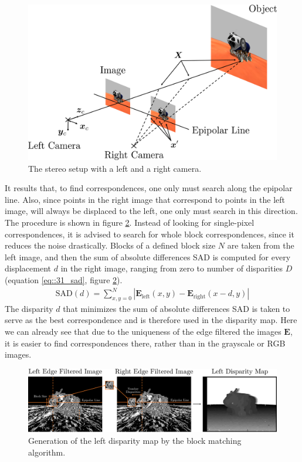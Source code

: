\begin{figure}[h!]
	\centering
	\includegraphics[scale=.28]{chapters/03_fundamentals_of_image_processing/img/stereo_camera.png}
	\caption{The stereo setup with a left and a right camera.}
	\label{fig::31_stereo_camera}
\end{figure}
It results that, to find correspondences, one only must search along the epipolar line. Also, since points in the right image that correspond to points in the left image, will always be displaced to the left, one only must search in this direction. The procedure is shown in figure \ref{fig::31_left_disparity_map}. Instead of looking for single-pixel correspondences, it is advised to search for whole block correspondences, since it reduces the noise drastically. Blocks of a defined block size $N$ are taken from the left image, and then the sum of absolute differences SAD is computed for every displacement $d$ in the right image, ranging from zero to number of disparities $D$ (equation \ref{eq::31_sad}, figure \ref{fig::31_left_disparity_map}).
\begin{align}
	\text{SAD}(d) = \sum_{x,y=0}^N |\bm{E}_\text{left}(x,y) - \bm{E}_\text{right}(x-d,y)|
	\label{eq::31_sad}
\end{align}
The disparity $d$ that minimizes the sum of absolute differences SAD is taken to serve as the best correspondence and is therefore used in the disparity map.  Here we can already see that due to the uniqueness of the edge filtered the images $\bm{E}$, it is easier to find correspondences there, rather than in the grayscale or RGB images.
\begin{figure}[h!]
	\centering
	\includegraphics[scale=.28]{chapters/03_fundamentals_of_image_processing/img/left_disparity_map.png}
	\caption{Generation of the left disparity map by the block matching algorithm.}
	\label{fig::31_left_disparity_map}
\end{figure}
